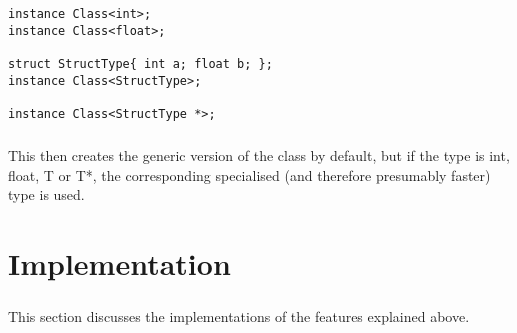 \documentclass[12pt,twoside,notitlepage]{report}
\begin{document}
\small{
\begin{verbatim}
instance Class<int>;
instance Class<float>;

struct StructType{ int a; float b; };
instance Class<StructType>;

instance Class<StructType *>;
\end{verbatim}
}

\paragraph{}
This then creates the generic version of the class by default, but if the type is int, float, T or T*, the corresponding specialised (and therefore presumably faster) type is used.

\cleardoublepage

\chapter{Implementation}

\paragraph{}
This section discusses the implementations of the features explained above.
\end{document}
